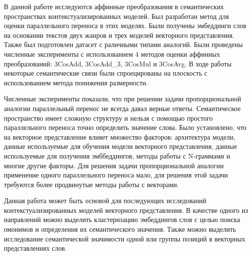 \documentclass[a4paper,14pt]{article}
\begin{document}
В данной работе исследуются аффинные преобразования в семантических пространствах контекстуализированных моделей.
Был разработан метод для оценки параллельного переноса в этих моделях.
Были получены эмбеддинги слов на основании текстов двух жанров и трех моделей векторного представления.
Также был подготовлен датасет с раличными типами аналогий.
Были проведены численные эксперименты с использованием 4 методов оценки аффинных преобразований: 3CosAdd, 3CosAdd\_3,  3CosMul и 3CosAvg.
В ходе работы некоторые семантические связи были спроецированы на плоскость с использованием метода понижения размерности.

Численные эксперименты показали, что при решении задачи пропорциональной аналогии параллельный перенос не всегда давал верные ответы.
Семантическое пространство имеет сложную структуру и нельзя с помощью простого параллельного переноса точно определить значение слова.
Было установлено, что на векторное представление влияет множество факторов: архитектура модели, данные используемые для обучения модели векторного представления, данные используемые для получения эмббеддингов, методы работы с N-граммами и многие другие факторы.
Для решения задачи пропорциональной аналогии применение одного параллельного переноса мало, для решения этой задачи требуются более продвинутые методы работы с векторами. 

Данная работа может быть основой для последующих исследований контекстуализированных моделей векторного представления.
В качестве одного из направлений можно выделить кластеризацию эмбеддингов слов с целью поиска омонимов и определения их семантического значения.
Также можно выделить исследование семантической значимости одной или группы позиций в векторных представлениях слов.
\end{document}
